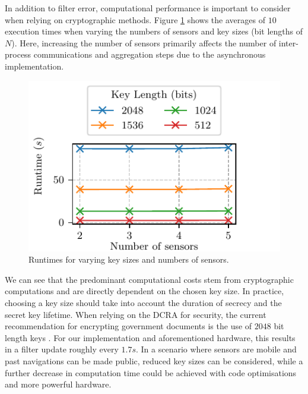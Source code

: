 \documentclass[10pt,letterpaper,oneside,twocolumn,journal]{IEEEtran}
\theoremstyle{definition}
\theoremstyle{definition}
\theoremstyle{remark}
\begin{document}
In addition to filter error, computational performance is important to consider when relying on cryptographic methods. Figure \ref{fig:sim_timing} shows the averages of $10$ execution times when varying the numbers of sensors and key sizes (bit lengths of $N$). Here, increasing the number of sensors primarily affects the number of inter-process communications and aggregation steps due to the asynchronous implementation.
\begin{figure}[htbp]
    \centering
    \includegraphics{images/timing.pdf}
    \caption{Runtimes for varying key sizes and numbers of sensors.}
    \label{fig:sim_timing}
\end{figure}
We can see that the predominant computational costs stem from cryptographic computations and are directly dependent on the chosen key size. In practice, choosing a key size should take into account the duration of secrecy and the secret key lifetime. When relying on the DCRA for security, the current recommendation for encrypting government documents is the use of $2048$ bit length keys \cite{barkerRecommendationPairwiseKey2019}. For our implementation and aforementioned hardware, this results in a filter update roughly every $1.7s$. In a scenario where sensors are mobile and past navigations can be made public, reduced key sizes can be considered, while a further decrease in computation time could be achieved with code optimisations and more powerful hardware.

% 
%                                               
%                                               
%                                               
% 
\end{document}
